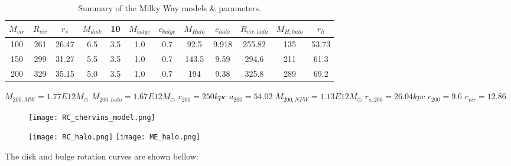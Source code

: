 \begin{table}[H]{\label{tab:MW}}
\begin{center}
\begin{tabular}{c c c c c c c c c c c c}
\hline
\hline
$M_{vir} $ & $R_{vir}$ & $r_s$ & $M_{disk}$ & 10 & $M_{bulge}$ & $c_{bulge} $ & $M_{Halo}$ & $c_{halo}$ & $R_{vir, halo}$ & $M_{H,halo}$ & $r_h $ \\
\hline
100 & 261 & 26.47 & 6.5 & 3.5 & 1.0 & 0.7 & 92.5 & 9.918 & 255.82 & 135 & 53.73 \\
150 & 299 & 31.27 & 5.5 & 3.5 & 1.0 & 0.7 & 143.5 & 9.59 & 294.6 & 211  & 61.3 \\
200 & 329 & 35.15 & 5.0 & 3.5 & 1.0 & 0.7 & 194 & 9.38 & 325.8 & 289 & 69.2 \\
\hline
\end{tabular}
\caption{Summary of the Milky Way models \& parameters.\label{tab:MWmodels}}
\end{center}
\end{table}

$M_{200,MW} = 1.77E12M_{\odot}$
$M_{200, halo} = 1.67E12M_{\odot}$
$r_{200} = 250kpc$
$a_{200} = 54.02$
$M_{200, NFW} = 1.13E12M_{\odot}$
$r_{s,200} = 26.04kpc$
$c_{200} = 9.6$
$c_{vir} = 12.86$


\begin{figure}[H]
\centering
\texttt{[image: RC\_chervins\_model.png]}
\end{figure}

\begin{figure}[H]
\centering
\texttt{[image: RC\_halo.png]}
\texttt{[image: ME\_halo.png]}
\end{figure}

The disk and bulge rotation curves are shown bellow:







